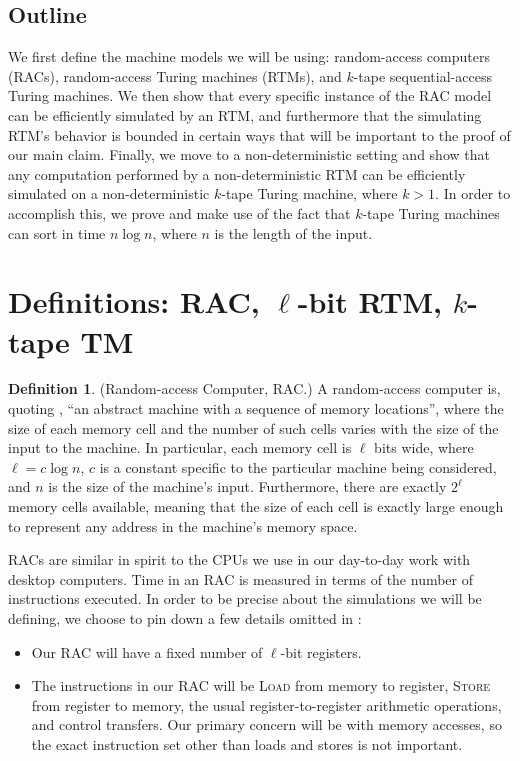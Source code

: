 \documentclass[english]{article}
\theoremstyle{plain}
\theoremstyle{definition}
\newtheorem{defn}[thm]{Definition}
\theoremstyle{plain}
\begin{document}
\subsection*{Outline}

We first define the machine models we will be using: random-access
computers (RACs), random-access Turing machines (RTMs), and $k$-tape
sequential-access Turing machines. We then show that every specific
instance of the RAC model can be efficiently simulated by an RTM, and
furthermore that the simulating RTM's behavior is bounded in certain
ways that will be important to the proof of our main claim. Finally,
we move to a non-deterministic setting and show that any computation
performed by a non-deterministic RTM can be efficiently simulated on a
non-deterministic $k$-tape Turing machine, where $k>1$. In order to
accomplish this, we prove and make use of the fact that $k$-tape
Turing machines can sort in time $n \log n$, where $n$ is the length
of the input.

\section{Definitions: RAC, $\ell$-bit RTM, $k$-tape TM}

\begin{defn}
  (Random-access Computer, RAC.) A random-access computer is, quoting
  \cite{DBLP:conf/ershov/GurevichS89}, ``an abstract machine with a
  sequence of memory locations'', where the size of each memory cell
  and the number of such cells varies with the size of the input to
  the machine. In particular, each memory cell is $\ell$ bits wide,
  where $\ell=c \log n$, $c$ is a constant specific to the particular
  machine being considered, and $n$ is the size of the machine's
  input. Furthermore, there are exactly $2^\ell$ memory cells
  available, meaning that the size of each cell is exactly large
  enough to represent any address in the machine's memory space.

  RACs are similar in spirit to the CPUs we use in our day-to-day work
  with desktop computers. Time in an RAC is measured in terms of the
  number of instructions executed. In order to be precise about the
  simulations we will be defining, we choose to pin down a few details
  omitted in \cite{DBLP:conf/ershov/GurevichS89}:

  \begin{itemize}
    \item Our RAC will have a fixed number of $\ell$-bit registers.

    \item The instructions in our RAC will be \textsc{Load} from
      memory to register, \textsc{Store} from register to memory, the
      usual register-to-register arithmetic operations, and control
      transfers. Our primary concern will be with memory accesses, so
      the exact instruction set other than loads and stores is not
      important.
  \end{itemize}
\end{defn}
\end{document}
